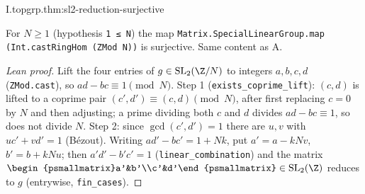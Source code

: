 \begin{theorem}[$\SL_2(\Z)\to\SL_2(\Z/N)$ is surjective]
\end{theorem}
\begin{tfformal}{I.topgrp.thm:sl2-reduction-surjective}
\begin{tffidelity}
For $N\ge1$ (hypothesis \texttt{1 ≤ N}) the map \texttt{Matrix.SpecialLinearGroup.map (Int.castRingHom (ZMod N))} is surjective. Same content as A.
\end{tffidelity}
\end{tfformal}
\begin{proof}[Lean proof]
Lift the four entries of $g\in\mathrm{SL}_2(\Z/N)$ to integers $a,b,c,d$ (\texttt{ZMod.cast}), so $ad-bc\equiv1\pmod N$. Step 1 (\texttt{exists\_coprime\_lift}): $(c,d)$ is lifted to a coprime pair $(c',d')\equiv(c,d)\pmod N$, after first replacing $c=0$ by $N$ and then adjusting; a prime dividing both $c$ and $d$ divides $ad-bc\equiv1$, so does not divide $N$. Step 2: since $\gcd(c',d')=1$ there are $u,v$ with $uc'+vd'=1$ (B\'ezout). Writing $ad'-bc'=1+Nk$, put $a'=a-kNv$, $b'=b+kNu$; then $a'd'-b'c'=1$ (\texttt{linear\_combination}) and the matrix $\begin{psmallmatrix}a'&b'\\c'&d'\end{psmallmatrix}\in\mathrm{SL}_2(\Z)$ reduces to $g$ (entrywise, \texttt{fin\_cases}).
\end{proof}

